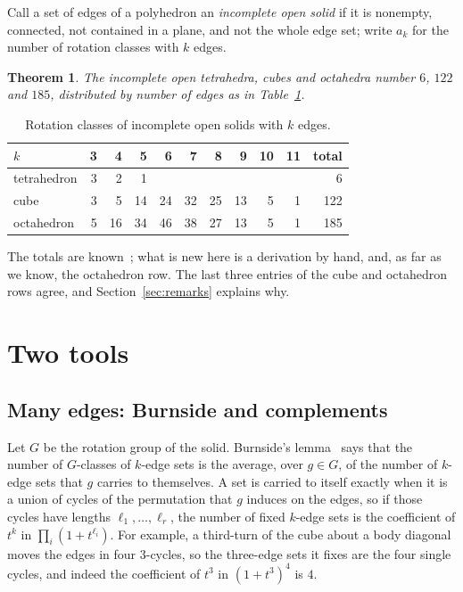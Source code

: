 \documentclass[11pt]{amsart}
\newtheorem{theorem}{Theorem}
\theoremstyle{remark}
\begin{document}
Call a set of edges of a polyhedron an \emph{incomplete open solid} if it is nonempty, connected, not contained in a plane, and not the whole edge set; write $a_k$ for the number of rotation classes with $k$ edges.

\begin{theorem}\label{thm:main}
The incomplete open tetrahedra, cubes and octahedra number $6$, $122$ and $185$, distributed by number of edges as in Table~\ref{tab:counts}.
\end{theorem}

\begin{table}[ht]
\centering
\begin{tabular}{l|rrrrrrrrr|r}
\toprule
$k$ & 3 & 4 & 5 & 6 & 7 & 8 & 9 & 10 & 11 & total\\
\midrule
tetrahedron & 3 & 2 & 1 & & & & & & & 6\\
cube & 3 & 5 & 14 & 24 & 32 & 25 & 13 & 5 & 1 & 122\\
octahedron & 5 & 16 & 34 & 46 & 38 & 27 & 13 & 5 & 1 & 185\\
\bottomrule
\end{tabular}
\caption{Rotation classes of incomplete open solids with $k$ edges.}
\label{tab:counts}
\end{table}

The totals are known~\cite{VJ}; what is new here is a derivation by hand, and, as far as we know, the octahedron row. The last three entries of the cube and octahedron rows agree, and Section~\ref{sec:remarks} explains why.

\section{Two tools}

\subsection{Many edges: Burnside and complements}

Let $G$ be the rotation group of the solid. Burnside's lemma~\cite[Ch.~6]{Aigner} says that the number of $G$-classes of $k$-edge sets is the average, over $g\in G$, of the number of $k$-edge sets that $g$ carries to themselves. A set is carried to itself exactly when it is a union of cycles of the permutation that $g$ induces on the edges, so if those cycles have lengths $\ell_1,\dots,\ell_r$, the number of fixed $k$-edge sets is the coefficient of $t^k$ in $\prod_i(1+t^{\ell_i})$. For example, a third-turn of the cube about a body diagonal moves the edges in four $3$-cycles, so the three-edge sets it fixes are the four single cycles, and indeed the coefficient of $t^3$ in $(1+t^3)^4$ is $4$.
\end{document}
